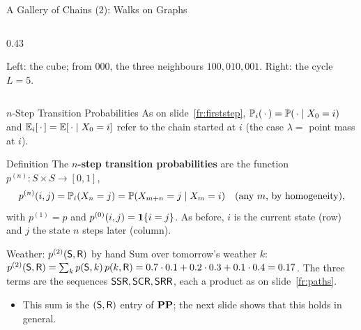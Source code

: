 \begin{frame}{A Gallery of Chains (2): Walks on Graphs}
\begin{columns}[T]
\begin{column}{0.43\textwidth}
\begin{tikzpicture}[scale=1.05,font=\scriptsize]
      \end{tikzpicture}
      \hspace{4mm}
      \par\medskip
      {\footnotesize Left: the cube; from $000$, the three neighbours $100,010,001$. Right: the cycle $L=5$.}
    \end{column}
  \end{columns}
\end{frame}


\begin{frame}{$n$-Step Transition Probabilities}
  \label{fr:nstep}
  \small
  As on slide~\ref{fr:firststep}, $\mathbb{P}_i(\,\cdot\,)=\mathbb{P}(\,\cdot\mid X_0=i)$ and $\mathbb{E}_i[\,\cdot\,]=\mathbb{E}[\,\cdot\mid X_0=i]$ refer to the chain started at $i$ (the case $\lambda=$ point mass at $i$).
  \begin{block}{Definition}
    The \textbf{$n$-step transition probabilities} are the function $p^{(n)}\colon S\times S\to[0,1]$,
    \[
      p^{(n)}(i,j)=\mathbb{P}_i(X_n=j)=\mathbb{P}(X_{m+n}=j\mid X_m=i)\quad\text{(any $m$, by homogeneity)},
    \]
    with $p^{(1)}=p$ and $p^{(0)}(i,j)=\mathbf{1}\{i=j\}$. As before, $i$ is the current state (row) and $j$ the state $n$ steps later (column).
  \end{block}
  \begin{exampleblock}{Weather: $p^{(2)}(\mathsf{S},\mathsf{R})$ by hand}
    Sum over tomorrow's weather $k$: $p^{(2)}(\mathsf{S},\mathsf{R})=\sum_k p(\mathsf{S},k)\,p(k,\mathsf{R})=0.7\cdot0.1+0.2\cdot0.3+0.1\cdot0.4=0.17$. The three terms are the sequences $\mathsf{SSR},\mathsf{SCR},\mathsf{SRR}$, each a product as on slide~\ref{fr:paths}.
  \end{exampleblock}
  \begin{itemize}
    \item This sum is the $(\mathsf{S},\mathsf{R})$ entry of $\mathbf{P}\mathbf{P}$; the next slide shows that this holds in general.
  \end{itemize}
\end{frame}

